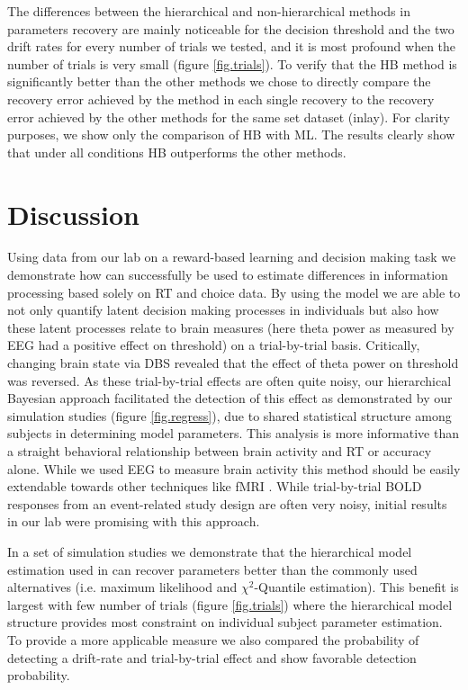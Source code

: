 \documentclass[letterpaper,10pt,english]{article}
\begin{document}
The differences between the hierarchical and non-hierarchical methods in parameters recovery are mainly noticeable for the decision threshold and the two drift rates for every number of trials we tested, and it is most profound when the number of trials is very small (figure \ref{fig.trials}). To verify that the HB method is significantly better than the other methods we chose to directly compare the recovery error achieved by the method in each single recovery to the recovery error achieved by the other methods for the same set dataset (inlay). For clarity purposes, we show only the comparison of HB with ML. The results clearly show that under all conditions HB outperforms the other methods.

\section*{Discussion}
Using data from our lab on a reward-based learning and decision making
task \citep{CavanaghWieckiCohenEtAl11} we demonstrate how 
can successfully be used to estimate differences in information
processing based solely on RT and choice data. By using the
 model we are able to not only quantify latent
decision making processes in individuals but also how these latent
processes relate to brain measures (here theta power as measured by
EEG had a positive effect on threshold) on a trial-by-trial basis.
Critically, changing brain state via DBS revealed that the effect of
theta power on threshold was reversed. As these trial-by-trial effects
are often quite noisy, our hierarchical Bayesian approach facilitated
the detection of this effect as demonstrated by our simulation studies (figure \ref{fig.regress}), due to shared statistical structure
among subjects in determining model parameters. This analysis is more
informative than a straight behavioral relationship between brain
activity and RT or accuracy alone. While we used EEG to measure brain
activity this method should be easily extendable towards other
techniques like fMRI \citep[e.g.][]{MaanenBrownEicheleEtAl11}. While
trial-by-trial BOLD responses from an event-related study design are
often very noisy, initial results in our lab were promising with this
approach.

In a set of simulation studies we demonstrate that the hierarchical
model estimation used in  can recover parameters better
than the commonly used alternatives (i.e. maximum likelihood and
$\chi^2$-Quantile estimation). This benefit is largest with few number
of trials (figure \ref{fig.trials}) where the hierarchical model
structure provides most constraint on individual subject parameter
estimation. To provide a more applicable measure we also compared the
probability of detecting a drift-rate and trial-by-trial effect and
show favorable detection probability.
\end{document}
